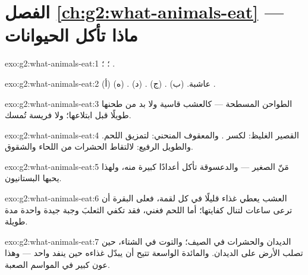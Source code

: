 \section*{الفصل \ref{ch:g2:what-animals-eat} --- ماذا تأكل الحيوانات}

\begin{solution}{exo:g2:what-animals-eat:1}
؛ ؛ .
\end{solution}

\begin{solution}{exo:g2:what-animals-eat:2}
(أ) عاشبة. (ب) . (ج) . (د) . (ه) .
\end{solution}

\begin{solution}{exo:g2:what-animals-eat:3}
الطواحن المسطحة ---  كالعشب قاسية ولا بد من طحنها طويلًا
قبل ابتلاعها؛ ولا فريسة تُمسك.
\end{solution}

\begin{solution}{exo:g2:what-animals-eat:4}
القصير الغليظ: لكسر . والمعقوف المنحني: لتمزيق اللحم.
والطويل الرفيع: لالتقاط الحشرات من اللحاء والشقوق.
\end{solution}

\begin{solution}{exo:g2:what-animals-eat:5}
مَنّ  الصغير --- والدعسوقة تأكل أعدادًا كبيرة منه، ولهذا
يحبها البستانيون.
\end{solution}

\begin{solution}{exo:g2:what-animals-eat:6}
العشب يعطي غذاء قليلًا في كل لقمة، فعلى البقرة أن ترعى ساعات لتنال
كفايتها؛ أما اللحم فغني، فقد تكفي الثعلبَ وجبة جيدة واحدة مدة
طويلة.
\end{solution}

\begin{solution}{exo:g2:what-animals-eat:7}
الديدان والحشرات في الصيف؛ والتوت في الشتاء، حين تصلب الأرض على
الديدان. والمائدة الواسعة تتيح  أن يبدّل غذاءه حين ينفد
واحد --- وهذا عون كبير في المواسم الصعبة.
\end{solution}

